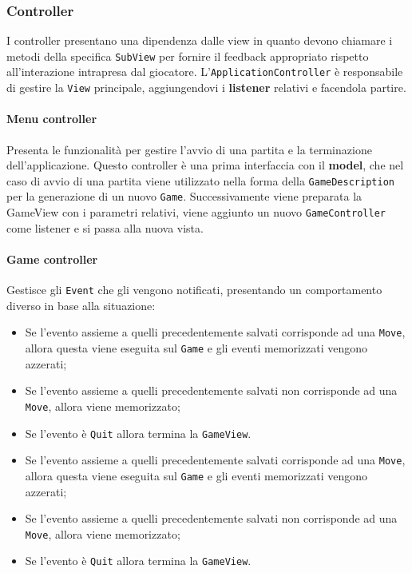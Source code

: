 
\subsubsection{Controller}
I controller presentano una dipendenza dalle view in quanto devono chiamare i metodi della specifica \texttt{SubView} per fornire il feedback appropriato rispetto all'interazione intrapresa dal giocatore.
%
L'\texttt{ApplicationController} è responsabile di gestire la \texttt{View} principale, aggiungendovi i \textbf{listener} relativi e facendola partire.
\paragraph{Menu controller}
%
Presenta le funzionalità per gestire l'avvio di una partita e la terminazione dell'applicazione.
%
Questo controller è una prima interfaccia con il \textbf{model}, che nel caso di avvio di una partita viene utilizzato nella forma della \texttt{GameDescription} per la generazione di un nuovo \texttt{Game}.
%
Successivamente viene preparata la GameView con i parametri relativi, viene aggiunto un nuovo \texttt{GameController} come listener e si passa alla nuova vista.
\paragraph{Game controller}
%
Gestisce gli \texttt{Event} che gli vengono notificati, presentando un comportamento diverso in base alla situazione:
\begin{itemize}
    \item Se l'evento assieme a quelli precedentemente salvati corrisponde ad una \texttt{Move}, allora questa viene eseguita sul \texttt{Game} e gli eventi memorizzati vengono azzerati;
    \item Se l'evento assieme a quelli precedentemente salvati non corrisponde ad una \texttt{Move}, allora viene memorizzato;
    \item Se l'evento è \texttt{Quit} allora termina la \texttt{GameView}.
\end{itemize}
\begin{itemize}
    \item Se l'evento assieme a quelli precedentemente salvati corrisponde ad una \texttt{Move}, allora questa viene eseguita sul \texttt{Game} e gli eventi memorizzati vengono azzerati;
    \item Se l'evento assieme a quelli precedentemente salvati non corrisponde ad una \texttt{Move}, allora viene memorizzato;
    \item Se l'evento è \texttt{Quit} allora termina la \texttt{GameView}.
\end{itemize}

